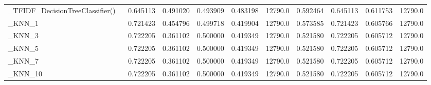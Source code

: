 \begin{tabular}{lrrrrrrrrr}
\_TFIDF\_DecisionTreeClassifier()\_                   &  0.645113 &         0.491020 &      0.493909 &        0.483198 &        12790.0 &            0.592464 &         0.645113 &           0.611753 &           12790.0 \\
\_KNN\_1                                             &  0.721423 &         0.454796 &      0.499718 &        0.419904 &        12790.0 &            0.573585 &         0.721423 &           0.605766 &           12790.0 \\
\_KNN\_3                                             &  0.722205 &         0.361102 &      0.500000 &        0.419349 &        12790.0 &            0.521580 &         0.722205 &           0.605712 &           12790.0 \\
\_KNN\_5                                             &  0.722205 &         0.361102 &      0.500000 &        0.419349 &        12790.0 &            0.521580 &         0.722205 &           0.605712 &           12790.0 \\
\_KNN\_7                                             &  0.722205 &         0.361102 &      0.500000 &        0.419349 &        12790.0 &            0.521580 &         0.722205 &           0.605712 &           12790.0 \\
\_KNN\_10                                            &  0.722205 &         0.361102 &      0.500000 &        0.419349 &        12790.0 &            0.521580 &         0.722205 &           0.605712 &           12790.0 \\
\bottomrule
\end{tabular}
